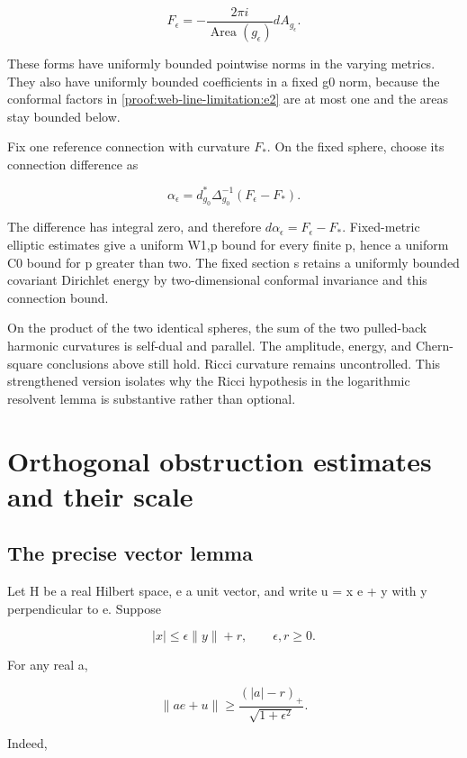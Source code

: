 \[
 F_\epsilon=-\frac{2\pi i}{\operatorname{Area}(g_\epsilon)}
             dA_{g_\epsilon}.
\]

These forms have uniformly bounded pointwise norms in the varying metrics. They also have uniformly bounded coefficients in a fixed g0 norm, because the conformal factors in \eqref{proof:web-line-limitation:e2} are at most one and the areas stay bounded below.

Fix one reference connection with curvature \(F_*\). On the fixed sphere, choose its connection difference as

\[
 \alpha_\epsilon=d_{g_0}^*\Delta_{g_0}^{-1}(F_\epsilon-F_*).
\]

The difference has integral zero, and therefore \(d\alpha_\epsilon=F_\epsilon-F_*\). Fixed-metric elliptic estimates give a uniform W1,p bound for every finite p, hence a uniform C0 bound for p greater than two. The fixed section s retains a uniformly bounded covariant Dirichlet energy by two-dimensional conformal invariance and this connection bound.

On the product of the two identical spheres, the sum of the two pulled-back harmonic curvatures is self-dual and parallel. The amplitude, energy, and Chern-square conclusions above still hold. Ricci curvature remains uncontrolled. This strengthened version isolates why the Ricci hypothesis in the logarithmic resolvent lemma is substantive rather than optional.


\section{Orthogonal obstruction estimates and their scale}
\label{sec:web-vector-scope}
\hypertarget{proof:web-vector-scope:s2}{%
\subsection{The precise vector lemma}\label{proof:web-vector-scope:s2}}

Let H be a real Hilbert space, e a unit vector, and write u = x e + y with y perpendicular to e. Suppose

\[
 |x|\le\epsilon\|y\|+r,
 \qquad \epsilon,r\ge0.
\tag{\thesection.1}\label{proof:web-vector-scope:e1}
\]

For any real a,

\[
 \boxed{\|a e+u\|\ge
 \frac{(|a|-r)_+}{\sqrt{1+\epsilon^2}}.}
\tag{\thesection.2}\label{proof:web-vector-scope:e2}
\]

Indeed,

